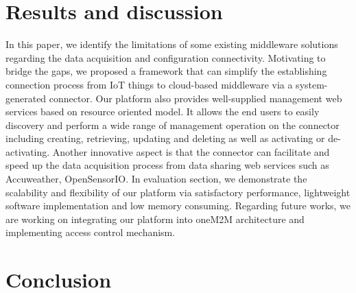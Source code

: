 \section{Results and discussion}
In this paper, we identify the limitations of some existing middleware solutions regarding the data acquisition and configuration connectivity. Motivating to bridge the gaps, we proposed a framework that can simplify the establishing connection process from IoT things to cloud-based middleware via a system-generated connector. Our platform also provides well-supplied management web services based on resource oriented model. It allows the end users to easily discovery and perform a wide range of management operation on the connector including creating, retrieving, updating and deleting as well as activating or de-activating. Another innovative aspect is that the connector can facilitate and speed up the data acquisition process from data sharing web services such as Accuweather, OpenSensorIO. In evaluation section, we demonstrate the scalability and flexibility of our platform via satisfactory performance, lightweight software implementation and low memory consuming. Regarding future works, we are working on integrating our platform into oneM2M architecture and implementing access control mechanism.
\section{Conclusion}
